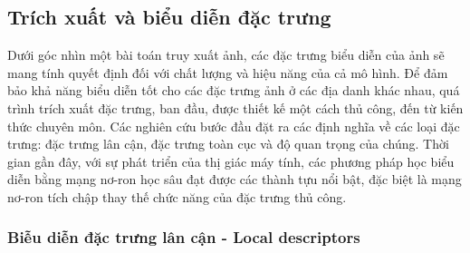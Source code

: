 \subsection{Trích xuất và biểu diễn đặc trưng}

Dưới góc nhìn một bài toán truy xuất ảnh, các đặc trưng biểu diễn của ảnh sẽ mang tính quyết định đối với chất lượng và hiệu năng của cả mô hình. Để đảm bảo khả năng biểu diễn tốt cho các đặc trưng ảnh ở các địa danh khác nhau, quá trình trích xuất đặc trưng, ban đầu, được thiết kế một cách thủ công, đến từ kiến thức chuyên môn. Các nghiên cứu bước đầu đặt ra các định nghĩa về các loại đặc trưng: đặc trưng lân cận, đặc trưng toàn cục và độ quan trọng của chúng. Thời gian gần đây, với sự phát triển của thị giác máy tính, các phương pháp học biểu diễn bằng mạng nơ-ron học sâu đạt được các thành tựu nổi bật, đặc biệt là mạng nơ-ron tích chập thay thế chức năng của đặc trưng thủ công.

\subsubsection{Biễu diễn đặc trưng lân cận - Local descriptors}

